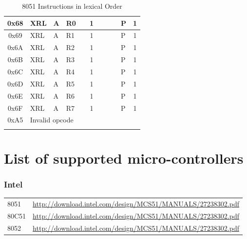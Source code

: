\documentclass[a4paper,twoside,12pt]{book}
\newcommand{\mysmallfont}{\fontsize{8pt}{10pt} \selectfont{}}
\begin{document}
{\begin{longtable}{|c|l|lll|c|llll|c|}
		0x68	& XRL	& A	& R0	&	& 1	&	&	&	& P	& 1	\\\hline
		0x69	& XRL	& A	& R1	&	& 1	&	&	&	& P	& 1	\\\hline
		0x6A	& XRL	& A	& R2	&	& 1	&	&	&	& P	& 1	\\\hline
		0x6B	& XRL	& A	& R3	&	& 1	&	&	&	& P	& 1	\\\hline
		0x6C	& XRL	& A	& R4	&	& 1	&	&	&	& P	& 1	\\\hline
		0x6D	& XRL	& A	& R5	&	& 1	&	&	&	& P	& 1	\\\hline
		0x6E	& XRL	& A	& R6	&	& 1	&	&	&	& P	& 1	\\\hline
		0x6F	& XRL	& A	& R7	&	& 1	&	&	&	& P	& 1	\\\hline
		0xA5	& \multicolumn{10}{l|}{Invalid opcode}						\\\hline

		\caption{8051 Instructions in lexical Order}
	\end{longtable}
	}

\chapter{List of supported micro-controllers}
	\subsection{Intel\textregistered}
		{
		\mysmallfont{}
		\begin{longtable}{ll}
			8051			& \url{http://download.intel.com/design/MCS51/MANUALS/27238302.pdf}		\\
			80C51			& \url{http://download.intel.com/design/MCS51/MANUALS/27238302.pdf}		\\
			8052			& \url{http://download.intel.com/design/MCS51/MANUALS/27238302.pdf}		\\
		\end{longtable}
		}
\end{document}
